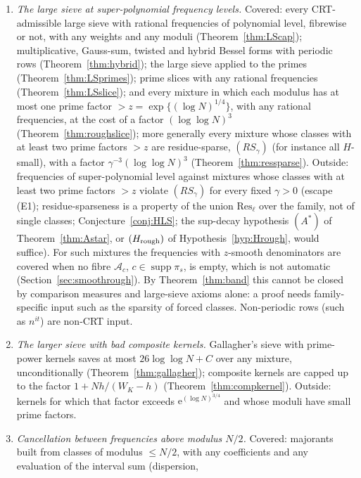 \documentclass[10pt,reqno]{amsart}
\theoremstyle{definition}
\theoremstyle{remark}
\newcommand{\A}{\mathcal A}
\newcommand{\e}{\mathrm e}
\begin{document}
\begin{enumerate}
\item \emph{The large sieve at super-polynomial frequency levels.}
  Covered: every CRT-admissible large sieve with rational frequencies of
  polynomial level, fibrewise or not, with any weights and any moduli
  (Theorem~\ref{thm:LScap}); multiplicative, Gauss-sum, twisted and
  hybrid Bessel forms with periodic rows (Theorem~\ref{thm:hybrid}); the
  large sieve applied to the primes (Theorem~\ref{thm:LSprimes}); prime
  slices with any rational frequencies (Theorem~\ref{thm:LSslice}); and
  every mixture in which each modulus has at most one prime factor
  $>z=\exp\{(\log N)^{1/4}\}$, with any rational frequencies, at the cost of a
  factor $(\log\log N)^3$ (Theorem~\ref{thm:roughslice}); more generally every
  mixture whose classes with at least two prime factors $>z$ are
  residue-sparse, $(RS_\gamma)$ (for instance all $H$-small), with a factor
  $\gamma^{-3}(\log\log N)^3$ (Theorem~\ref{thm:ressparse}).
  Outside: frequencies of super-polynomial level against mixtures whose
  classes with at least two prime factors $>z$ violate $(RS_\gamma)$ for every
  fixed $\gamma>0$ (escape (E1); residue-sparseness is a property of the union
  $\mathrm{Res}_\ell$ over the family, not of single classes;
  Conjecture~\ref{conj:HLS}; the sup-decay hypothesis $(A^*)$ of
  Theorem~\ref{thm:Astar}, or $(H_{\rm rough})$ of Hypothesis~\ref{hyp:Hrough},
  would suffice).  For such mixtures the frequencies with $z$-smooth
  denominators are covered when no fibre $\A_c$, $c\in\operatorname{supp}\pi_s$, is empty,
  which is not automatic (Section~\ref{sec:smoothrough}).  By
  Theorem~\ref{thm:band} this cannot be closed by comparison measures
  and large-sieve axioms alone: a proof needs family-specific input such
  as the sparsity of forced classes.  Non-periodic rows (such as $n^{it}$) are non-CRT input.
\item \emph{The larger sieve with bad composite kernels.}  Gallagher's
  sieve with prime-power kernels saves at most $26\log\log N+C$ over any
  mixture, unconditionally (Theorem~\ref{thm:gallagher}); composite
  kernels are capped up to the factor $1+Nh/(W_K-h)$
  (Theorem~\ref{thm:compkernel}).  Outside: kernels for which that factor
  exceeds $\e^{(\log N)^{3/4}}$ and whose moduli have small prime factors.
\item \emph{Cancellation between frequencies above modulus $N/2$.}
  Covered: majorants built from classes of modulus $\leq N/2$, with any
  coefficients and any evaluation of the interval sum (dispersion,

\end{enumerate}
\end{document}
